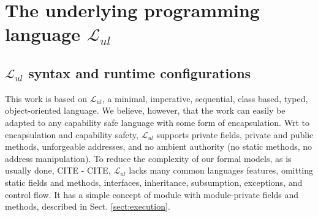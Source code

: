 \renewcommand{\LangOO}{\ensuremath{{\mathcal{L}}_{ul}}\xspace }

\section{The underlying programming language \LangOO}  
\label{sect:underlying}

\subsection{\LangOO syntax and runtime configurations}
\label{sub:Loo} 
This work is based on \LangOO, a {minimal}, imperative, sequential,  class based, typed, object-oriented language. 
We believe, however, that the work can easily be adapted to any capability safe language with some form of encapsulation. 
Wrt to encapsulation and  capability safety,  \LangOO supports private fields, private and public methods, unforgeable addresses, and no ambient authority (no static methods, no address manipulation).
To reduce the complexity of our formal models, as is usually done, CITE - CITE,  \LangOO lacks many
common languages features, omitting static fields and methods, interfaces,
inheritance, subsumption, exceptions, and control flow.  
  It has a simple concept of module with module-private fields and methods, described in Sect. \ref{sect:execution}.
 
